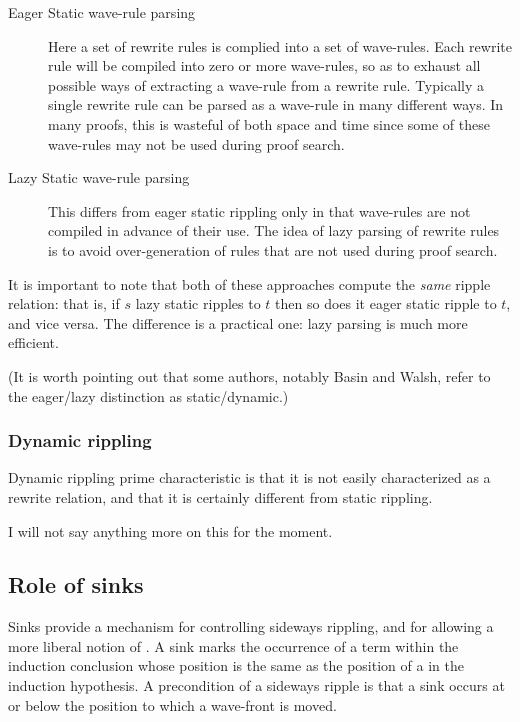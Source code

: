 \begin{description}
\item [Eager Static wave-rule parsing]
Here a set of rewrite rules is complied into a set of wave-rules.
Each rewrite rule will be compiled into zero or more wave-rules, so as
to exhaust all possible ways of extracting a wave-rule from a rewrite rule.   Typically a
single rewrite rule can be parsed as a wave-rule in many different
ways.  In many proofs, this is wasteful of both space and time since
some of these wave-rules may not be used during proof search.

\item [Lazy Static wave-rule parsing]
This differs from eager static rippling only in that wave-rules are not
compiled in advance of their use.  The idea of lazy parsing of rewrite
rules is to avoid over-generation of rules that are not used during
proof search.
\end{description}
It is important to note that both of these approaches compute the {\em
same\/} ripple relation: that is, if $s$ lazy static ripples to $t$
then so does it eager static ripple to $t$, and vice versa.  The
difference is a practical one: lazy parsing is much more efficient.

(It is worth pointing out that some authors, notably Basin and Walsh,
refer to the eager/lazy distinction as static/dynamic.)


\subsubsection {Dynamic rippling}
Dynamic rippling prime characteristic is that it is not easily
characterized as a rewrite relation, and that it is certainly
different from static rippling.  

I will not say anything more on this for the moment.

\subsection {Role of sinks}
\label{sinks}
 Sinks provide a mechanism for controlling
sideways rippling,
and for allowing a more liberal notion of . A
sink marks the occurrence of a term within the induction conclusion
whose position is the same as the position of a  in the induction hypothesis.  A
precondition of a sideways ripple is
that a sink occurs at or below the position to which a wave-front is
moved. 

